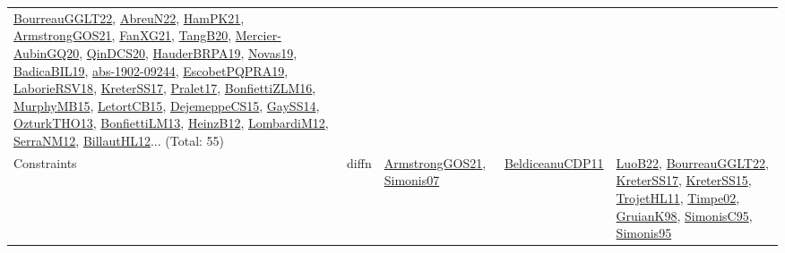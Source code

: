 {\begin{longtable}{lp{3cm}>{\raggedright}p{6cm}>{\raggedright}p{6cm}p{8cm}}
\href{articles/BourreauGGLT22.pdf}{BourreauGGLT22}\cite{BourreauGGLT22}, \href{articles/AbreuN22.pdf}{AbreuN22}\cite{AbreuN22}, \href{articles/HamPK21.pdf}{HamPK21}\cite{HamPK21}, \href{papers/ArmstrongGOS21.pdf}{ArmstrongGOS21}\cite{ArmstrongGOS21}, \href{articles/FanXG21.pdf}{FanXG21}\cite{FanXG21}, \href{papers/TangB20.pdf}{TangB20}\cite{TangB20}, \href{papers/Mercier-AubinGQ20.pdf}{Mercier-AubinGQ20}\cite{Mercier-AubinGQ20}, \href{articles/QinDCS20.pdf}{QinDCS20}\cite{QinDCS20}, \href{articles/HauderBRPA19.pdf}{HauderBRPA19}\cite{HauderBRPA19}, \href{articles/Novas19.pdf}{Novas19}\cite{Novas19}, \href{papers/BadicaBIL19.pdf}{BadicaBIL19}\cite{BadicaBIL19}, \href{articles/abs-1902-09244.pdf}{abs-1902-09244}\cite{abs-1902-09244}, \href{articles/EscobetPQPRA19.pdf}{EscobetPQPRA19}\cite{EscobetPQPRA19}, \href{articles/LaborieRSV18.pdf}{LaborieRSV18}\cite{LaborieRSV18}, \href{articles/KreterSS17.pdf}{KreterSS17}\cite{KreterSS17}, \href{papers/Pralet17.pdf}{Pralet17}\cite{Pralet17}, \href{papers/BonfiettiZLM16.pdf}{BonfiettiZLM16}\cite{BonfiettiZLM16}, \href{papers/MurphyMB15.pdf}{MurphyMB15}\cite{MurphyMB15}, \href{articles/LetortCB15.pdf}{LetortCB15}\cite{LetortCB15}, \href{papers/DejemeppeCS15.pdf}{DejemeppeCS15}\cite{DejemeppeCS15}, \href{papers/GaySS14.pdf}{GaySS14}\cite{GaySS14}, \href{articles/OzturkTHO13.pdf}{OzturkTHO13}\cite{OzturkTHO13}, \href{papers/BonfiettiLM13.pdf}{BonfiettiLM13}\cite{BonfiettiLM13}, \href{papers/HeinzB12.pdf}{HeinzB12}\cite{HeinzB12}, \href{articles/LombardiM12.pdf}{LombardiM12}\cite{LombardiM12}, \href{papers/SerraNM12.pdf}{SerraNM12}\cite{SerraNM12}, \href{papers/BillautHL12.pdf}{BillautHL12}\cite{BillautHL12}... (Total: 55)\\
Constraints & diffn & \href{papers/ArmstrongGOS21.pdf}{ArmstrongGOS21}\cite{ArmstrongGOS21}, \href{articles/Simonis07.pdf}{Simonis07}\cite{Simonis07} & \href{articles/BeldiceanuCDP11.pdf}{BeldiceanuCDP11}\cite{BeldiceanuCDP11} & \href{papers/LuoB22.pdf}{LuoB22}\cite{LuoB22}, \href{articles/BourreauGGLT22.pdf}{BourreauGGLT22}\cite{BourreauGGLT22}, \href{articles/KreterSS17.pdf}{KreterSS17}\cite{KreterSS17}, \href{papers/KreterSS15.pdf}{KreterSS15}\cite{KreterSS15}, \href{articles/TrojetHL11.pdf}{TrojetHL11}\cite{TrojetHL11}, \href{articles/Timpe02.pdf}{Timpe02}\cite{Timpe02}, \href{papers/GruianK98.pdf}{GruianK98}\cite{GruianK98}, \href{papers/SimonisC95.pdf}{SimonisC95}\cite{SimonisC95}, \href{papers/Simonis95.pdf}{Simonis95}\cite{Simonis95}\\

\end{longtable}}
